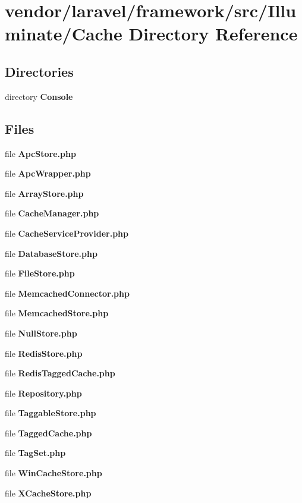 \section{vendor/laravel/framework/src/\+Illuminate/\+Cache Directory Reference}
\label{dir_bb02b3c15a76c41b415e43ae922e8b21}
\subsection*{Directories}
\begin{DoxyCompactItemize}
\item 
directory {\bf Console}
\end{DoxyCompactItemize}
\subsection*{Files}
\begin{DoxyCompactItemize}
\item 
file {\bf Apc\+Store.\+php}
\item 
file {\bf Apc\+Wrapper.\+php}
\item 
file {\bf Array\+Store.\+php}
\item 
file {\bf Cache\+Manager.\+php}
\item 
file {\bf Cache\+Service\+Provider.\+php}
\item 
file {\bf Database\+Store.\+php}
\item 
file {\bf File\+Store.\+php}
\item 
file {\bf Memcached\+Connector.\+php}
\item 
file {\bf Memcached\+Store.\+php}
\item 
file {\bf Null\+Store.\+php}
\item 
file {\bf Redis\+Store.\+php}
\item 
file {\bf Redis\+Tagged\+Cache.\+php}
\item 
file {\bf Repository.\+php}
\item 
file {\bf Taggable\+Store.\+php}
\item 
file {\bf Tagged\+Cache.\+php}
\item 
file {\bf Tag\+Set.\+php}
\item 
file {\bf Win\+Cache\+Store.\+php}
\item 
file {\bf X\+Cache\+Store.\+php}
\end{DoxyCompactItemize}
